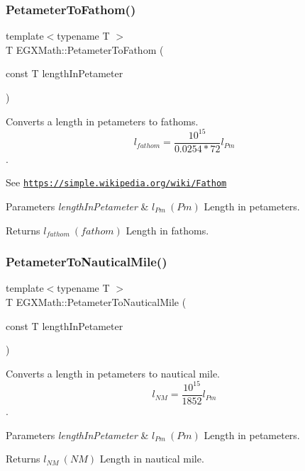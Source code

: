 \subsubsection{\texorpdfstring{Petameter\+To\+Fathom()}{PetameterToFathom()}}
{\footnotesize\ttfamily template$<$typename T $>$ \\
T E\+G\+X\+Math\+::\+Petameter\+To\+Fathom (\begin{DoxyParamCaption}\item[{const T}]{length\+In\+Petameter }\end{DoxyParamCaption})}



Converts a length in petameters to fathoms. \[ l_{fathom}= \frac{10^{15}}{0.0254 * 72} l_{Pm} \]. 

See \href{https://simple.wikipedia.org/wiki/Fathom}{\tt https\+://simple.\+wikipedia.\+org/wiki/\+Fathom} 
\begin{DoxyParams}{Parameters}
{\em length\+In\+Petameter} & $ l_{Pm}\ (Pm)$ Length in petameters. \\
\hline
\end{DoxyParams}
\begin{DoxyReturn}{Returns}
$ l_{fathom}\ (fathom)$ Length in fathoms. 
\end{DoxyReturn}
\mbox{\label{group___e_g_x_math-_conversions-_length_conversions-_s_i-_petameter-_nautical_gad71d96fd4a94e830ae0e768a41d993af}} 
\subsubsection{\texorpdfstring{Petameter\+To\+Nautical\+Mile()}{PetameterToNauticalMile()}}
{\footnotesize\ttfamily template$<$typename T $>$ \\
T E\+G\+X\+Math\+::\+Petameter\+To\+Nautical\+Mile (\begin{DoxyParamCaption}\item[{const T}]{length\+In\+Petameter }\end{DoxyParamCaption})}



Converts a length in petameters to nautical mile. \[ l_{NM}= \frac{10^{15}}{1852} l_{Pm} \]. 


\begin{DoxyParams}{Parameters}
{\em length\+In\+Petameter} & $ l_{Pm}\ (Pm)$ Length in petameters. \\
\hline
\end{DoxyParams}
\begin{DoxyReturn}{Returns}
$ l_{NM}\ (NM)$ Length in nautical mile. 
\end{DoxyReturn}
